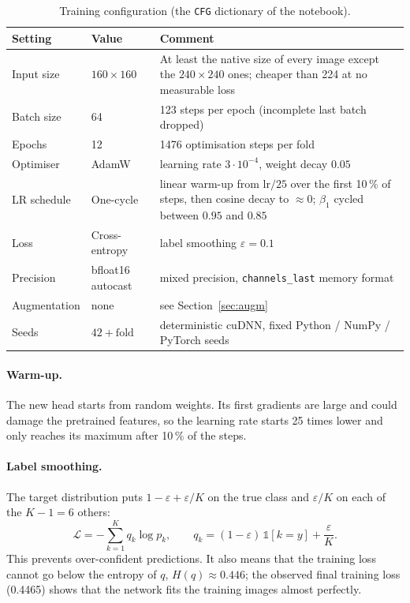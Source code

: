 \documentclass[11pt,a4paper]{article}
\newcommand{\code}[1]{\texttt{\small #1}}
\begin{document}
\begin{table}[H]
\centering\small
\caption{Training configuration (the \code{CFG} dictionary of the notebook).}
\label{tab:hyper}
\begin{tabularx}{0.92\textwidth}{@{}l l X@{}}
\toprule
\textbf{Setting} & \textbf{Value} & \textbf{Comment} \\
\midrule
Input size        & $160\times160$ & At least the native size of every image except the $240\times240$ ones; cheaper than 224 at no measurable loss \\
Batch size        & 64             & 123 steps per epoch (incomplete last batch dropped) \\
Epochs            & 12             & \num{1476} optimisation steps per fold \\
Optimiser         & AdamW \cite{loshchilov2019adamw} & learning rate $3\cdot10^{-4}$, weight decay $0.05$ \\
LR schedule       & One-cycle \cite{smith2019superconvergence} & linear warm-up from $\text{lr}/25$ over the first 10\,\% of steps, then cosine decay to $\approx0$; $\beta_1$ cycled between $0.95$ and $0.85$ \\
Loss              & Cross-entropy  & label smoothing $\varepsilon=0.1$ \cite{szegedy2016rethinking} \\
Precision         & bfloat16 autocast & mixed precision, \code{channels\_last} memory format \\
Augmentation      & none           & see Section~\ref{sec:augm} \\
Seeds             & $42+\text{fold}$ & deterministic cuDNN, fixed Python / NumPy / PyTorch seeds \\
\bottomrule
\end{tabularx}
\end{table}

\paragraph{Warm-up.} The new head starts from random weights. Its first gradients are large and could
damage the pretrained features, so the learning rate starts 25 times lower and only reaches its maximum
after 10\,\% of the steps.

\paragraph{Label smoothing.} The target distribution puts $1-\varepsilon+\varepsilon/K$ on the true class
and $\varepsilon/K$ on each of the $K-1=6$ others:
\begin{equation}
  \mathcal L = -\sum_{k=1}^{K} q_k \log p_k, \qquad
  q_k = (1-\varepsilon)\,\mathbb 1[k=y] + \frac{\varepsilon}{K}.
\end{equation}
This prevents over-confident predictions. It also means that the training loss cannot go below the
entropy of $q$, $H(q)\approx0.446$; the observed final training loss (0.4465) shows that the network fits
the training images almost perfectly.
\end{document}
